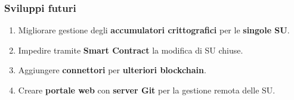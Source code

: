 \documentclass{beamer}
\begin{document}

\begin{frame}
	\frametitle{Sviluppi futuri}
	\begin{enumerate}
		\item Migliorare gestione degli \textbf{accumulatori crittografici} per le \textbf{singole SU}.
		\item Impedire tramite \textbf{Smart Contract} la modifica di SU chiuse.
		\item Aggiungere \textbf{connettori} per \textbf{ulteriori blockchain}.
		\item Creare \textbf{portale web} con \textbf{server Git} per la gestione remota delle SU.
	\end{enumerate}
\end{frame}


\begin{frame}

\end{frame}
\end{document}
